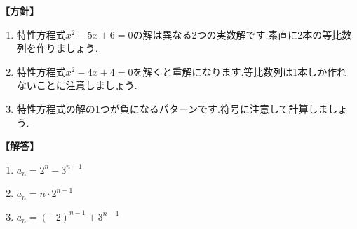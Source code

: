 \noindent\textbf{【方針】}
\begin{enumerate}[label=(\arabic*),parsep=3pt]
  \item 特性方程式$x^2-5x+6=0$の解は異なる2つの実数解です.素直に2本の等比数列を作りましょう.
  \item 特性方程式$x^2-4x+4=0$を解くと重解になります.等比数列は1本しか作れないことに注意しましょう.
  \item 特性方程式の解の1つが負になるパターンです.符号に注意して計算しましょう.
\end{enumerate}

\noindent\textbf{【解答】}
\begin{enumerate}[label=(\arabic*),parsep=3pt]
  \item $\displaystyle a_n=2^n-3^{n-1}$
  \item $\displaystyle a_n=n\cdot2^{n-1}$
  \item $\displaystyle a_n=(-2)^{n-1}+3^{n-1}$
\end{enumerate}

